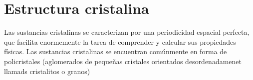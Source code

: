 \chapter{Estructura cristalina}

Las sustancias cristalinas se caracterizan por una periodicidad espacial perfecta, que facilita enormemente la tarea de comprender y calcular sus propiedades físicas. Las sustancias cristalinas se encuentran comúnmente en forma de policristales (aglomerados de pequeñas cristales orientados desordenadamenet llamads cristalitos o granos)